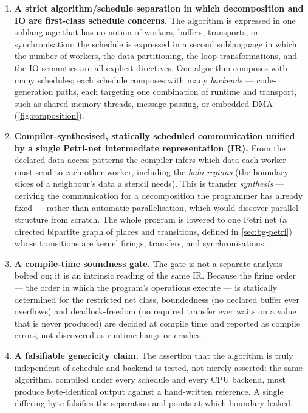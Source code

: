 \begin{enumerate}[leftmargin=*]
  \item \textbf{A strict algorithm/schedule separation in which decomposition
        and IO are first-class schedule concerns.} The algorithm is expressed in
        one sublanguage that has no notion of workers, buffers, transports, or
        synchronisation; the schedule is expressed in a second sublanguage in
        which the number of workers, the data partitioning, the loop
        transformations, and the IO semantics are all explicit directives. One
        algorithm composes with many schedules; each schedule composes with many
        \emph{backends} --- code-generation paths, each targeting one combination
        of runtime and transport, such as shared-memory threads, message passing,
        or embedded DMA (\cref{fig:composition}).

  \item \textbf{Compiler-synthesised, statically scheduled communication unified
        by a single Petri-net intermediate representation (IR).} From the
        declared data-access patterns the compiler infers which data each worker
        must send to each other worker, including the \emph{halo regions} (the
        boundary slices of a neighbour's data a stencil needs). This is transfer
        \emph{synthesis} --- deriving the communication for a decomposition the
        programmer has already fixed --- rather than automatic parallelisation,
        which would discover parallel structure from scratch. The whole program
        is lowered to one Petri net (a directed bipartite graph of places and
        transitions, defined in \cref{sec:bg-petri}) whose transitions are kernel
        firings, transfers, and synchronisations.

  \item \textbf{A compile-time soundness gate.} The gate is not a separate
        analysis bolted on; it is an intrinsic reading of the same IR. Because the
        firing order --- the order in which the program's operations execute --- is
        statically determined for the restricted net class,
        boundedness (no declared buffer ever overflows) and deadlock-freedom (no
        required transfer ever waits on a value that is never produced) are
        decided at compile time and reported as compile errors, not discovered as
        runtime hangs or crashes.

  \item \textbf{A falsifiable genericity claim.} The assertion that the algorithm
        is truly independent of schedule and backend is tested, not merely
        asserted: the same algorithm, compiled under every schedule and every
        CPU backend, must produce byte-identical output against a hand-written
        reference. A single differing byte falsifies the separation and points
        at which boundary leaked.


\end{enumerate}
